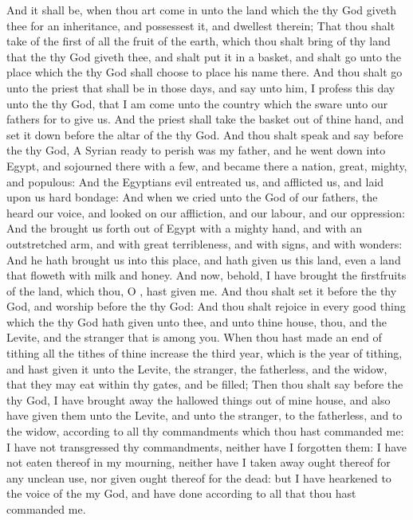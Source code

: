 \begin{biblechapter} %
 And it shall be, when thou art come in unto the land which the \LORD thy God giveth thee for an inheritance, and possessest it, and dwellest therein;
\verse That thou shalt take of the first of all the fruit of the earth, which thou shalt bring of thy land that the \LORD thy God giveth thee, and shalt put it in a basket, and shalt go unto the place which the \LORD thy God shall choose to place his name there.
\verse And thou shalt go unto the priest that shall be in those days, and say unto him, I profess this day unto the \LORD thy God, that I am come unto the country which the \LORD sware unto our fathers for to give us.
\verse And the priest shall take the basket out of thine hand, and set it down before the altar of the \LORD thy God.
\verse And thou shalt speak and say before the \LORD thy God, A Syrian ready to perish was my father, and he went down into Egypt, and sojourned there with a few, and became there a nation, great, mighty, and populous:
\verse And the Egyptians evil entreated us, and afflicted us, and laid upon us hard bondage:
\verse And when we cried unto the \LORD God of our fathers, the \LORD heard our voice, and looked on our affliction, and our labour, and our oppression:
\verse And the \LORD brought us forth out of Egypt with a mighty hand, and with an outstretched arm, and with great terribleness, and with signs, and with wonders:
\verse And he hath brought us into this place, and hath given us this land, even a land that floweth with milk and honey.
\verse And now, behold, I have brought the firstfruits of the land, which thou, O \LORD, hast given me. And thou shalt set it before the \LORD thy God, and worship before the \LORD thy God:
\verse And thou shalt rejoice in every good thing which the \LORD thy God hath given unto thee, and unto thine house, thou, and the Levite, and the stranger that is among you.
\verse When thou hast made an end of tithing all the tithes of thine increase the third year, which is the year of tithing, and hast given it unto the Levite, the stranger, the fatherless, and the widow, that they may eat within thy gates, and be filled;
\verse Then thou shalt say before the \LORD thy God, I have brought away the hallowed things out of mine house, and also have given them unto the Levite, and unto the stranger, to the fatherless, and to the widow, according to all thy commandments which thou hast commanded me: I have not transgressed thy commandments, neither have I forgotten them:
\verse I have not eaten thereof in my mourning, neither have I taken away ought thereof for any unclean use, nor given ought thereof for the dead: but I have hearkened to the voice of the \LORD my God, and have done according to all that thou hast commanded me.

\end{biblechapter}
